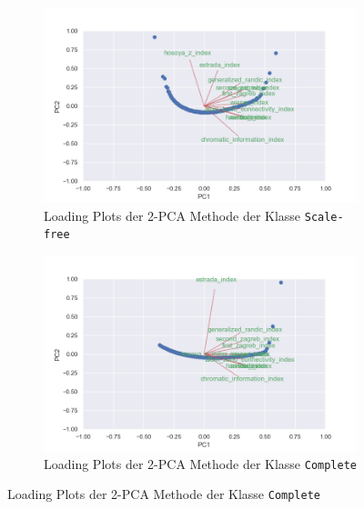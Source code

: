 \begin{figure}[H]
    \begin{subfigure}{.5\textwidth}
        \includegraphics[width=\textwidth]{images/30_results/scalefree-pca-loadings.png}
        \caption{Loading Plots der 2-PCA Methode der Klasse \texttt{Scale-free}}
        \label{fig:pca-loading-scalefree}
    \end{subfigure}%
    \begin{subfigure}{.5\textwidth}
        \includegraphics[width=\textwidth]{images/30_results/complete-pca-loadings.png}
        \caption{Loading Plots der 2-PCA Methode der Klasse \texttt{Complete}}
        \label{fig:pca-loading-complete}
    \end{subfigure}
\end{figure}


